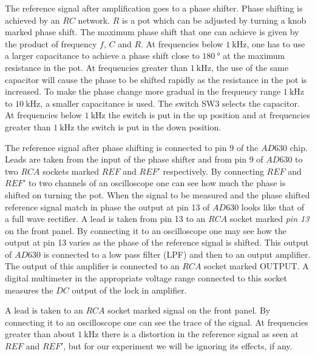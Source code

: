 \documentclass[%
 reprint,
nofootinbib,
 amsmath,amssymb,
 aps,
]{revtex4-2}
\begin{document}
    \par
    The reference signal after amplification goes to a phase shifter. Phase shifting is achieved by an $RC$ network. $R$ is a pot which can be adjusted by turning a knob marked phase shift. The maximum phase shift that one can achieve is given by the product of frequency $f$, $C$ and $R$. At frequencies below $\SI{1}{\kilo \hertz}$, one has to use a larger capacitance to achieve a phase shift close to $\SI{180}{\degree}$ at the maximum resistance in the pot. At frequencies greater than $\SI{1}{\kilo \hertz}$, the use of the same capacitor will cause the phase to be shifted rapidly as the resistance in the pot is increased. To make the phase change more gradual in the frequency range $\SI{1}{\kilo \hertz}$ to $\SI{10}{\kilo \hertz}$, a smaller capacitance is used. The switch SW3 selects the capacitor. At frequencies below $\SI{1}{\kilo \hertz}$ the switch is put in the up position and at frequencies greater than $\SI{1}{\kilo \hertz}$ the switch is put in the down position.
    \par
    The reference signal after phase shifting is connected to pin 9 of the $AD630$ chip. Leads are taken from the input of the phase shifter and from pin 9 of $AD630$ to two $RCA$ sockets marked $REF$ and $REF'$ respectively. By connecting $REF$ and $REF'$ to two channels of an oscilloscope one can see how much the phase is shifted on turning the pot. When the signal to be measured and the phase shifted reference signal match in phase the output at pin 13 of $AD630$ looks like that of a full wave rectifier. A lead is taken from pin 13 to an $RCA$ socket marked \textit{pin 13} on the front panel. By connecting it to an oscilloscope one may see how the output at pin 13 varies as the phase of the reference signal is shifted. This output of $AD630$ is connected to a low pass filter (LPF) and then to an output amplifier. The output of this amplifier is connected to an $RCA$ socket marked OUTPUT. A digital multimeter in the appropriate voltage range connected to this socket measures the $DC$ output of the lock in amplifier.
    \par
    A lead is taken to an $RCA$ socket marked signal on the front panel. By connecting it to an oscilloscope one can see the trace of the signal. At frequencies greater than about $\SI{1}{\kilo \hertz}$ there is a distortion in the reference signal as seen at $REF$ and $REF'$, but for our experiment we will be ignoring its effects, if any. 
\end{document}
